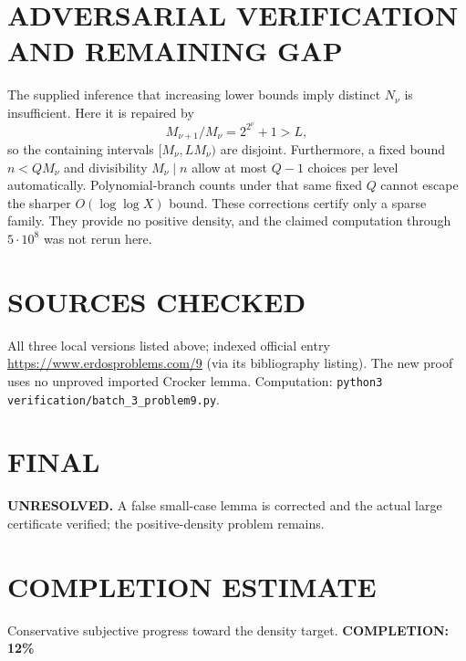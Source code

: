 \section{ADVERSARIAL VERIFICATION AND REMAINING GAP}
The supplied inference that increasing lower bounds imply distinct $N_\nu$ is insufficient. Here it is repaired by
\[
M_{\nu+1}/M_\nu=2^{2^\nu}+1>L,
\]
so the containing intervals $[M_\nu,LM_\nu)$ are disjoint. Furthermore, a fixed bound $n<QM_\nu$ and divisibility $M_\nu\mid n$ allow at most $Q-1$ choices per level automatically. Polynomial-branch counts under that same fixed $Q$ cannot escape the sharper $O(\log\log X)$ bound. These corrections certify only a sparse family. They provide no positive density, and the claimed computation through $5\cdot10^8$ was not rerun here.
\section{SOURCES CHECKED}
All three local versions listed above; indexed official entry \url{https://www.erdosproblems.com/9} (via its bibliography listing). The new proof uses no unproved imported Crocker lemma. Computation: \texttt{python3 verification/batch\_3\_problem9.py}.
\section{FINAL}
\textbf{UNRESOLVED.} A false small-case lemma is corrected and the actual large certificate verified; the positive-density problem remains.
\section{COMPLETION ESTIMATE}
Conservative subjective progress toward the density target.
\textbf{COMPLETION: 12\%}
